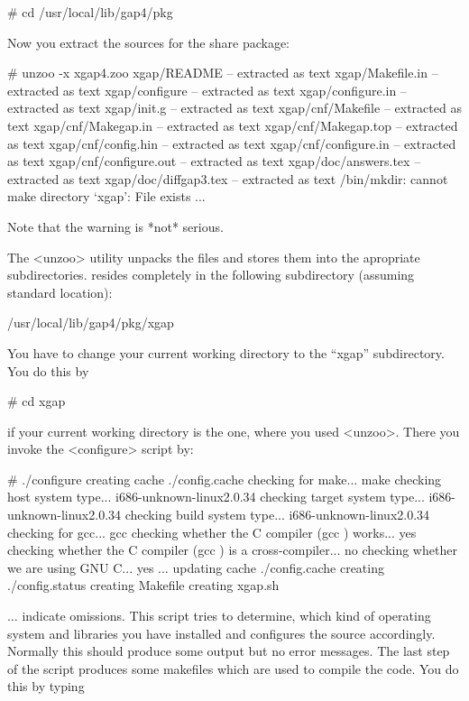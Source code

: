 \begintt
# cd /usr/local/lib/gap4/pkg
\endtt

Now you extract the sources for the {\XGAP} share package:

\begintt
# unzoo -x xgap4.zoo
xgap/README     -- extracted as text
xgap/Makefile.in        -- extracted as text
xgap/configure  -- extracted as text
xgap/configure.in       -- extracted as text
xgap/init.g     -- extracted as text
xgap/cnf/Makefile       -- extracted as text
xgap/cnf/Makegap.in     -- extracted as text
xgap/cnf/Makegap.top    -- extracted as text
xgap/cnf/config.hin     -- extracted as text
xgap/cnf/configure.in   -- extracted as text
xgap/cnf/configure.out  -- extracted as text
xgap/doc/answers.tex    -- extracted as text
xgap/doc/diffgap3.tex   -- extracted as text
/bin/mkdir: cannot make directory `xgap': File exists
...
\endtt

Note that the warning is *not* serious.

The <unzoo> utility unpacks the files and stores them into the apropriate
subdirectories. {\XGAP} resides completely in the following subdirectory
(assuming standard location):

\begintt
/usr/local/lib/gap4/pkg/xgap
\endtt


You have to change your current working directory to the ``xgap''
subdirectory. You do this by

\begintt
# cd xgap
\endtt

if your current working directory is the one, where you used
<unzoo>. There you invoke the <configure> script by:

\begintt
# ./configure
creating cache ./config.cache
checking for make... make
checking host system type... i686-unknown-linux2.0.34
checking target system type... i686-unknown-linux2.0.34
checking build system type... i686-unknown-linux2.0.34
checking for gcc... gcc
checking whether the C compiler (gcc  ) works... yes
checking whether the C compiler (gcc  ) is a cross-compiler... no
checking whether we are using GNU C... yes
...
updating cache ./config.cache
creating ./config.status
creating Makefile
creating xgap.sh
\endtt

$\ldots$ indicate omissions. 
This script tries to determine, which kind of operating system and
libraries you have installed and configures the source
accordingly. Normally this should produce some output but no error
messages. The last step of the script produces some makefiles which are
used to compile the code. You do this by typing

